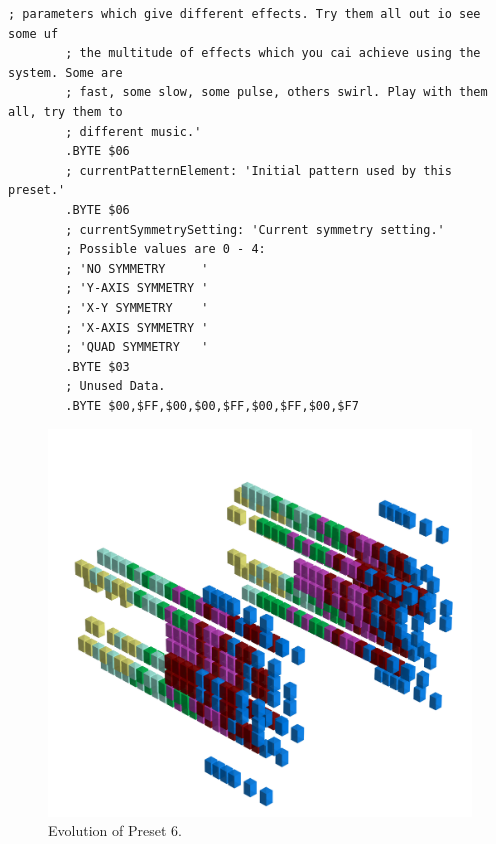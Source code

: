 \begin{lstlisting}[basicstyle=\tiny,caption=Source code for Preset 5.]
        ; parameters which give different effects. Try them all out io see some uf
        ; the multitude of effects which you cai achieve using the system. Some are
        ; fast, some slow, some pulse, others swirl. Play with them all, try them to
        ; different music.'
        .BYTE $06
        ; currentPatternElement: 'Initial pattern used by this preset.'
        .BYTE $06
        ; currentSymmetrySetting: 'Current symmetry setting.'
        ; Possible values are 0 - 4:
        ; 'NO SYMMETRY     '
        ; 'Y-AXIS SYMMETRY '
        ; 'X-Y SYMMETRY    '
        ; 'X-AXIS SYMMETRY '
        ; 'QUAD SYMMETRY   '
        .BYTE $03
        ; Unused Data.
        .BYTE $00,$FF,$00,$00,$FF,$00,$FF,$00,$F7
\end{lstlisting}


\clearpage                                                                 
\begin{figure}[H]                                                          
    \centering                                                             
    \begin{adjustbox}{width=14cm,center}                                   
      \includegraphics[width=14cm]{src/presets/pattern6-45.png}%
    \end{adjustbox}                                                        
\caption{Evolution of Preset 6.}                                           
\end{figure}                                                               
\clearpage                                                                 
                                                                           
